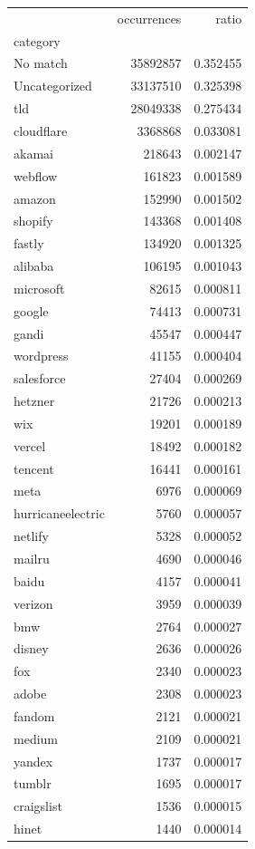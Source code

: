 \begin{tabular}{lrr}
\toprule
 & occurrences & ratio \\
category &  &  \\
\midrule
No match & 35892857 & 0.352455 \\
Uncategorized & 33137510 & 0.325398 \\
tld & 28049338 & 0.275434 \\
cloudflare & 3368868 & 0.033081 \\
akamai & 218643 & 0.002147 \\
webflow & 161823 & 0.001589 \\
amazon & 152990 & 0.001502 \\
shopify & 143368 & 0.001408 \\
fastly & 134920 & 0.001325 \\
alibaba & 106195 & 0.001043 \\
microsoft & 82615 & 0.000811 \\
google & 74413 & 0.000731 \\
gandi & 45547 & 0.000447 \\
wordpress & 41155 & 0.000404 \\
salesforce & 27404 & 0.000269 \\
hetzner & 21726 & 0.000213 \\
wix & 19201 & 0.000189 \\
vercel & 18492 & 0.000182 \\
tencent & 16441 & 0.000161 \\
meta & 6976 & 0.000069 \\
hurricaneelectric & 5760 & 0.000057 \\
netlify & 5328 & 0.000052 \\
mailru & 4690 & 0.000046 \\
baidu & 4157 & 0.000041 \\
verizon & 3959 & 0.000039 \\
bmw & 2764 & 0.000027 \\
disney & 2636 & 0.000026 \\
fox & 2340 & 0.000023 \\
adobe & 2308 & 0.000023 \\
fandom & 2121 & 0.000021 \\
medium & 2109 & 0.000021 \\
yandex & 1737 & 0.000017 \\
tumblr & 1695 & 0.000017 \\
craigslist & 1536 & 0.000015 \\
hinet & 1440 & 0.000014 \\

\end{tabular}
